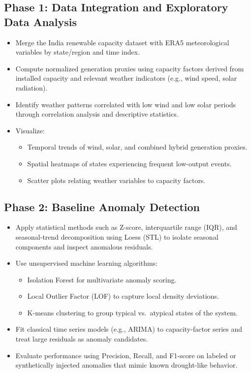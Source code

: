 \documentclass[12pt,a4paper]{article}
\begin{document}
\subsection*{Phase 1: Data Integration and Exploratory Data Analysis}
\begin{itemize}
    \item Merge the India renewable capacity dataset with ERA5 meteorological variables by state/region and time index.\cite{kaggle_india_renewables,era5}
    \item Compute normalized generation proxies using capacity factors derived from installed capacity and relevant weather indicators (e.g., wind speed, solar radiation).\cite{lead_anomaly}
    \item Identify weather patterns correlated with low wind and low solar periods through correlation analysis and descriptive statistics.\cite{grid_change_point}
    \item Visualize:
    \begin{itemize}
        \item Temporal trends of wind, solar, and combined hybrid generation proxies.
        \item Spatial heatmaps of states experiencing frequent low-output events.
        \item Scatter plots relating weather variables to capacity factors.
    \end{itemize}
\end{itemize}

\subsection*{Phase 2: Baseline Anomaly Detection}
\begin{itemize}
    \item Apply statistical methods such as Z-score, interquartile range (IQR), and seasonal-trend decomposition using Loess (STL) to isolate seasonal components and inspect anomalous residuals.\cite{stl_smartgrid}
    \item Use unsupervised machine learning algorithms:
    \begin{itemize}
        \item Isolation Forest for multivariate anomaly scoring.\cite{lead_anomaly}
        \item Local Outlier Factor (LOF) to capture local density deviations.
        \item K-means clustering to group typical vs.\ atypical states of the system.
    \end{itemize}
    \item Fit classical time series models (e.g., ARIMA) to capacity-factor series and treat large residuals as anomaly candidates.\cite{iot_wind_arima}
    \item Evaluate performance using Precision, Recall, and F1-score on labeled or synthetically injected anomalies that mimic known drought-like behavior.\cite{lead_anomaly,grid_change_point}
\end{itemize}
\end{document}
